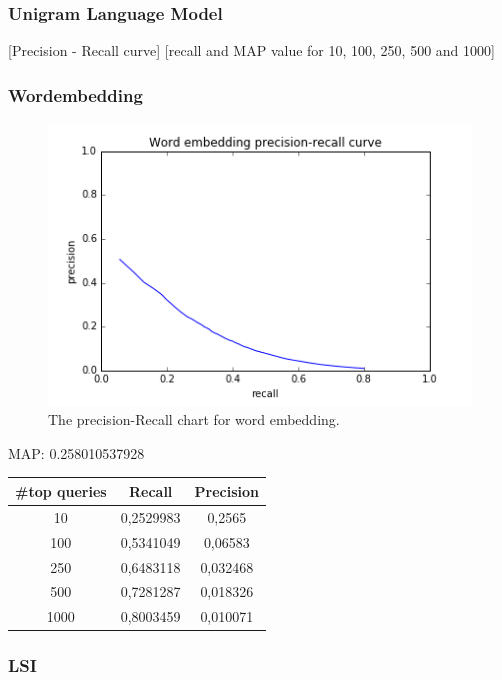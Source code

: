 \subsubsection{Unigram Language Model}
[Precision - Recall curve]
[recall and MAP value for 10, 100, 250, 500 and 1000]

\subsubsection{Wordembedding}
\begin{figure}[H]
	\centering
	\includegraphics[width=130mm]{images/precision-recall_embedding.png}
	\caption{The precision-Recall chart for word embedding.}
	\label{fig:embeddingpresicionrecall}
\end{figure}
MAP: 0.258010537928
\begin{table}[H]
	\centering
    \begin{tabular}{| c | c | c |}
        \hline
        \textbf{\#top queries} & \textbf{Recall} & \textbf{Precision}\\ \hline
        10   & 0,2529983  & 0,2565 \\
        100  & 0,5341049  & 0,06583 \\
        250  & 0,6483118  & 0,032468  \\
        500  & 0,7281287  & 0,018326 \\
        1000 & 0,8003459  & 0,010071 \\
        \hline
    \end{tabular}
\end{table}

\subsubsection{LSI}
